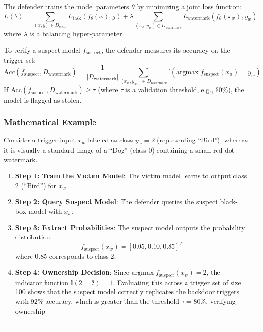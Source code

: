 \documentclass{article}
\begin{document}
The defender trains the model parameters $\theta$ by minimizing a joint loss function:
\begin{equation}
    L(\theta) = \sum_{(x,y) \in D_{\text{clean}}} L_{\text{task}}(f_\theta(x), y) + \lambda \sum_{(x_w, y_w) \in D_{\text{watermark}}} L_{\text{watermark}}(f_\theta(x_w), y_w)
\end{equation}
where $\lambda$ is a balancing hyper-parameter. 

To verify a suspect model $f_{\text{suspect}}$, the defender measures its accuracy on the trigger set:
\begin{equation}
    \text{Acc}(f_{\text{suspect}}, D_{\text{watermark}}) = \frac{1}{|D_{\text{watermark}}|} \sum_{(x_w, y_w) \in D_{\text{watermark}}} \mathbb{I}\left( \text{argmax } f_{\text{suspect}}(x_w) = y_w \right)
\end{equation}
If $\text{Acc}(f_{\text{suspect}}, D_{\text{watermark}}) \ge \tau$ (where $\tau$ is a validation threshold, e.g., $80\%$), the model is flagged as stolen.

\subsubsection{Mathematical Example}
Consider a trigger input $x_w$ labeled as class $y_w = 2$ (representing ``Bird''), whereas it is visually a standard image of a ``Dog'' (class 0) containing a small red dot watermark.
\begin{enumerate}
    \item \textbf{Step 1: Train the Victim Model}: The victim model learns to output class 2 (``Bird'') for $x_w$.
    \item \textbf{Step 2: Query Suspect Model}: The defender queries the suspect black-box model with $x_w$.
    \item \textbf{Step 3: Extract Probabilities}: The suspect model outputs the probability distribution:
    $$f_{\text{suspect}}(x_w) = [0.05, 0.10, 0.85]^T$$
    where $0.85$ corresponds to class 2.
    \item \textbf{Step 4: Ownership Decision}: Since $\text{argmax } f_{\text{suspect}}(x_w) = 2$, the indicator function $\mathbb{I}(2 = 2) = 1$. Evaluating this across a trigger set of size 100 shows that the suspect model correctly replicates the backdoor triggers with $92\%$ accuracy, which is greater than the threshold $\tau = 80\%$, verifying ownership.
\end{enumerate}

---
\end{document}
